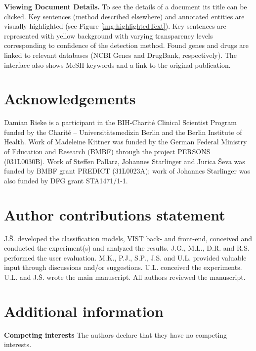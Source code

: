 \documentclass[fleqn,10pt]{wlscirep}
\begin{document}

\textbf{Viewing Document Details.}
To see the details of a document its title can be clicked. Key sentences (method described elsewhere) and annotated entities are visually highlighted (see Figure \ref{img:highlightedText}). Key sentences are represented with yellow background with varying transparency levels corresponding to confidence of the detection method. Found genes and drugs are linked to relevant databases (NCBI Genes and DrugBank, respectively). The interface also shows MeSH keywords and a link to the original publication.


%

\section*{Acknowledgements}

Damian Rieke is a participant in the BIH-Charité Clinical Scientist Program funded by the Charité – Universitätsmedizin Berlin and the Berlin Institute of Health. Work of Madeleine Kittner was funded by the German Federal Ministry of Education and Research (BMBF) through the project PERSONS (031L0030B). Work of Steffen Pallarz, Johannes Starlinger and Jurica Ševa was funded by BMBF grant PREDICT (31L0023A); work of Johannes Starlinger was also funded by DFG grant STA1471/1-1.

\section*{Author contributions statement}
J.Š. developed the classification models, VIST back- and front-end, conceived and conducted the experiment(s) and analyzed the results.
J.G., M.L., D.R. and R.S. performed the user evaluation. 
M.K., P.J., S.P., J.S. and U.L. provided valuable input through discussions and/or suggestions. 
U.L. conceived the experiments. 
U.L. and J.Š. wrote the main manuscript. 
All authors reviewed the manuscript. 

\section*{Additional information}

\textbf{Competing interests} The authors declare that they have no competing interests.
\end{document}
